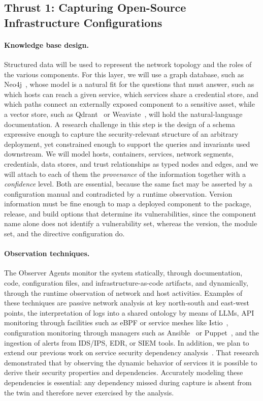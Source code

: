 \subsection{Thrust 1: Capturing Open-Source Infrastructure Configurations}
\label{sec:thrust1}

\paragraph{Knowledge base design.}
Structured data will be used to represent the network topology and the roles
of the various components. For this layer, we will use a graph database, such
as Neo4j~\cite{neo4j}, whose model is a natural fit for the questions that
\sysname must answer, such as which hosts can reach a given service, which
services share a credential store, and which paths connect an externally
exposed component to a sensitive asset, while a vector store, such as
Qdrant~\cite{qdrant} or Weaviate~\cite{weaviate}, will hold the
natural-language documentation. A research challenge in this
step is the design of a schema expressive enough to capture the
security-relevant structure of an arbitrary deployment, yet constrained
enough to support the queries and invariants used downstream. We will model
hosts, containers, services, network segments, credentials, data stores, and
trust relationships as typed nodes and edges, and we will attach to each of
them the \emph{provenance} of the information together with a
\emph{confidence} level. Both are essential, because the same fact may be
asserted by a configuration manual and contradicted by a runtime observation.
Version information must be fine enough to map a deployed component to the
package, release, and build options that determine its vulnerabilities, since the component name alone does not identify a vulnerability set, whereas
the version, the module set, and the directive configuration do.

\paragraph{Observation techniques.}
The Observer Agents monitor the system statically, through documentation,
code, configuration files, and infrastructure-as-code artifacts, and
dynamically, through the runtime observation of network and host activities.
Examples of these techniques are passive network analysis at key north-south
and east-west points, the interpretation of logs into a shared ontology by
means of LLMs, API monitoring through facilities such as eBPF or service
meshes like Istio~\cite{istio}, configuration monitoring through managers
such as Ansible~\cite{ansible} or Puppet~\cite{puppet}, and the ingestion of
alerts from IDS/IPS, EDR, or SIEM tools. In addition, we plan to extend our
previous work on service security dependency analysis~\cite{achilles}. That
research demonstrated that by observing the dynamic behavior of services it
is possible to derive their security properties and dependencies. Accurately modeling these dependencies is essential: any dependency missed
during capture is absent from the twin and therefore never exercised by the
analysis.


